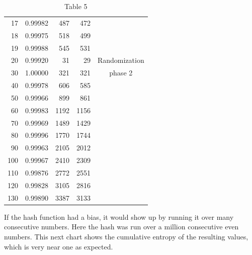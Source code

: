 \documentclass[preprint]{sigplanconf}
\begin{document}
\begin{table}
\begin{center}
\begin{tabular}{|r|r|r|r|c|}
            17            & 0.99982          & 487           & 472            &                \\
            18            & 0.99975          & 518           & 499            &                \\
            19            & 0.99988          & 545           & 531            &                \\
            \hline
            20            & 0.99920          & 31            & 29             & Randomization  \\
            30            & 1.00000          & 321           & 321            & phase 2        \\
            40            & 0.99978          & 606           & 585            &                \\
            50            & 0.99966          & 899           & 861            &                \\
            60            & 0.99983          & 1192          & 1156           &                \\
            70            & 0.99969          & 1489          & 1429           &                \\
            80            & 0.99996          & 1770          & 1744           &                \\
            90            & 0.99963          & 2105          & 2012           &                \\
            100           & 0.99967          & 2410          & 2309           &                \\
            110           & 0.99876          & 2772          & 2551           &                \\
            120           & 0.99828          & 3105          & 2816           &                \\
            130           & 0.99890          & 3387          & 3133           &                \\
            \hline
        \end{tabular}
        \caption{Table 5}
        \label{tab-5}
    \end{center}
\end{table}

If the hash function had a bias, it would show up by running it over many consecutive numbers. Here the hash was run over a million consecutive even numbers. This next chart shows the cumulative entropy of the resulting values, which is very near one as expected.
\end{document}
